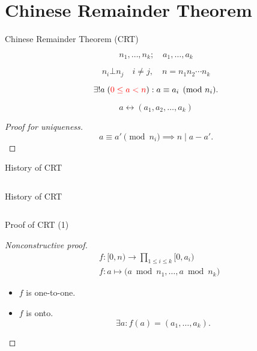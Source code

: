 \section{Chinese Remainder Theorem}

\begin{frame}{Chinese Remainder Theorem (CRT)}
  \begin{theorem}[CRT]
	\[
	  n_1, \ldots, n_k; \quad a_1, \ldots, a_k
	\]

	\[ 
	  n_i \bot n_j \quad i \neq j, \quad n = n_1n_2\cdots n_k 
	\]

    \[
	  \exists! a\; (\textcolor{red}{0 \le a < n}): a \equiv a_i \pmod{n_i}.
	\]
  \end{theorem}

  \pause
  \[
	a \leftrightarrow (a_1, a_2, \ldots, a_k)
  \]

  \pause
  \begin{proof}[Proof for uniqueness]
	\[
	  a \equiv a' \pmod{n_i} \implies n \mid a - a'.
	\]
  \end{proof}
\end{frame}
\begin{frame}{History of CRT}
  \begin{columns}
	  \pause
  \end{columns}
\end{frame}
\begin{frame}{History of CRT}
  \begin{columns}
  \end{columns}
\end{frame}
\begin{frame}{Proof of CRT (1)}
  \begin{proof}[Nonconstructive proof]
	\begin{align*}
	  &f: [0,n) \to \prod_{1 \le i \le k} [0,a_i) \\
	  &f: a \mapsto \big( a \bmod n_1, \dots, a \bmod n_k \big)
	\end{align*}

	\pause

	\begin{itemize}[<+->]
	  \item $f$ is one-to-one.
	  \item $f$ is onto.
		\[
		  \exists a: f(a) = (a_1, \dots, a_k).
		\]
	\end{itemize}
  \end{proof}
\end{frame}
